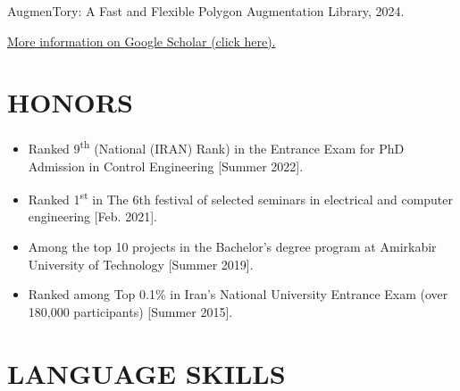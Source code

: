 \documentclass[11pt,a4paper,sans]{moderncv} %
\begin{document}
	\href{https://arxiv.org/abs/2405.04442}{\textcolor{gray}{\faCloudDownload} }AugmenTory: A Fast and Flexible Polygon Augmentation Library, 2024.	
 
 
 \vspace{1em}
	\centerline{{{	\faGraduationCap  \hspace{0.5 pt} \href{https://scholar.google.com/citations?user=wTnN9IEAAAAJ&hl=en}{More information on Google Scholar (click here).}}}}


	\section{HONORS}
	
	\begin{itemize}
		\item Ranked 9\textsuperscript{th} (National (IRAN) Rank) in the Entrance Exam for PhD Admission in Control Engineering [Summer 2022].
		
		\item Ranked 1\textsuperscript{st} in The 6th festival of selected seminars in electrical and computer engineering [Feb. 2021].

  
	\item 
Among the top 10 projects in the Bachelor's degree program at Amirkabir University of Technology [Summer 2019].

		\item 
Ranked among Top 0.1\% in Iran's National University Entrance Exam (over 180,000 participants) [Summer 2015].

	\end{itemize}
	
	
	\section{LANGUAGE SKILLS}
	
\end{document}
